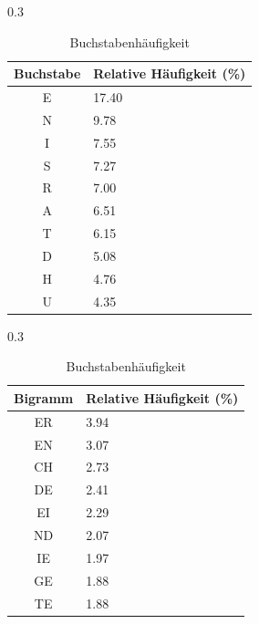 \begin{table}[H]
	\centering
	\begin{subtable}[t]{0.3\textwidth}
		\centering
		\begin{tabular}{c|p{1.9cm}}
			\textbf{Buchstabe} & Relative Häufigkeit (\%) \\ \midrule
			E                  & 17.40                    \\ \midrule
			N                  & 9.78                     \\ \midrule
			I                  & 7.55                     \\ \midrule
			S                  & 7.27                     \\ \midrule
			R                  & 7.00                     \\ \midrule
			A                  & 6.51                     \\ \midrule
			T                  & 6.15                     \\ \midrule
			D                  & 5.08                     \\ \midrule
			H                  & 4.76                     \\ \midrule
			U                  & 4.35                     \\
		\end{tabular}
		\caption{Buchstabenhäufigkeit}
	\end{subtable}
	\hspace{0.5cm}
	\begin{subtable}[t]{0.3\textwidth}
		\centering
		\begin{tabular}{c|p{1.9cm}}
			\textbf{Bigramm} & Relative Häufigkeit (\%) \\ \midrule
			ER               & 3.94                     \\ \midrule
			EN               & 3.07                     \\ \midrule
			CH               & 2.73                     \\ \midrule
			DE               & 2.41                     \\ \midrule
			EI               & 2.29                     \\ \midrule
			ND               & 2.07                     \\ \midrule
			IE               & 1.97                     \\ \midrule
			GE               & 1.88                     \\ \midrule
			TE               & 1.88                     \\ \midrule

\end{tabular}
\end{subtable}
\end{table}
